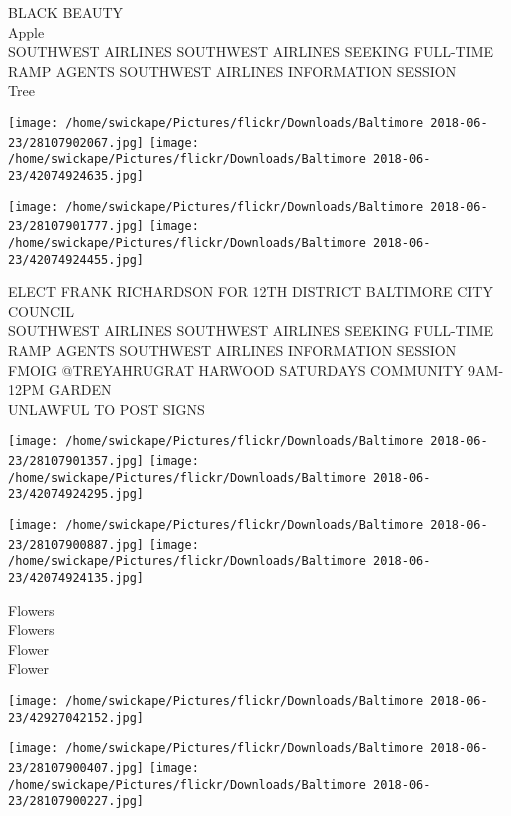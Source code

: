 \documentclass[10pt,letterpaper]{article}
\begin{document}
BLACK BEAUTY\\
Apple\\
SOUTHWEST AIRLINES SOUTHWEST AIRLINES SEEKING FULL{-}TIME RAMP AGENTS SOUTHWEST AIRLINES INFORMATION SESSION\\
Tree\\
\pagebreak

\texttt{[image: /home/swickape/Pictures/flickr/Downloads/Baltimore 2018-06-23/28107902067.jpg]}
\texttt{[image: /home/swickape/Pictures/flickr/Downloads/Baltimore 2018-06-23/42074924635.jpg]}

\texttt{[image: /home/swickape/Pictures/flickr/Downloads/Baltimore 2018-06-23/28107901777.jpg]}
\texttt{[image: /home/swickape/Pictures/flickr/Downloads/Baltimore 2018-06-23/42074924455.jpg]}

ELECT FRANK RICHARDSON FOR 12TH DISTRICT BALTIMORE CITY COUNCIL\\
SOUTHWEST AIRLINES SOUTHWEST AIRLINES SEEKING FULL{-}TIME RAMP AGENTS SOUTHWEST AIRLINES INFORMATION SESSION\\
FMOIG @TREYAHRUGRAT HARWOOD SATURDAYS COMMUNITY 9AM{-}12PM GARDEN\\
UNLAWFUL TO POST SIGNS\\
\pagebreak

\texttt{[image: /home/swickape/Pictures/flickr/Downloads/Baltimore 2018-06-23/28107901357.jpg]}
\texttt{[image: /home/swickape/Pictures/flickr/Downloads/Baltimore 2018-06-23/42074924295.jpg]}

\texttt{[image: /home/swickape/Pictures/flickr/Downloads/Baltimore 2018-06-23/28107900887.jpg]}
\texttt{[image: /home/swickape/Pictures/flickr/Downloads/Baltimore 2018-06-23/42074924135.jpg]}

Flowers\\
Flowers\\
Flower\\
Flower\\
\pagebreak

\texttt{[image: /home/swickape/Pictures/flickr/Downloads/Baltimore 2018-06-23/42927042152.jpg]}

\vspace{0.25in}
\texttt{[image: /home/swickape/Pictures/flickr/Downloads/Baltimore 2018-06-23/28107900407.jpg]}
\texttt{[image: /home/swickape/Pictures/flickr/Downloads/Baltimore 2018-06-23/28107900227.jpg]}
\end{document}

